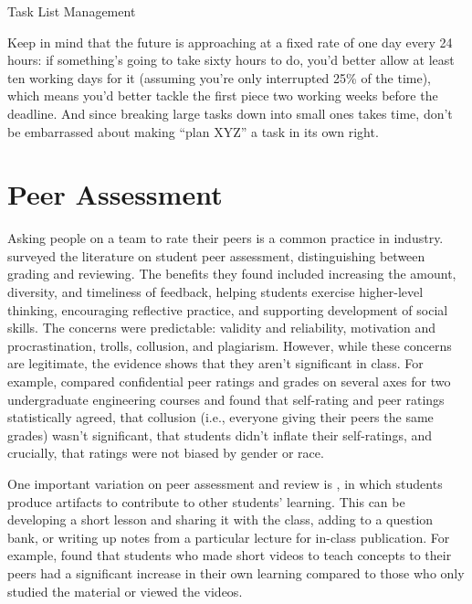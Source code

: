 \begin{callout}{Task List Management}

  Keep in mind that the future is approaching at a fixed rate of one
  day every 24 hours: if something's going to take sixty hours to do,
  you'd better allow at least ten working days for it (assuming you're
  only interrupted 25\% of the time), which means you'd better tackle
  the first piece two working weeks before the deadline.  And since
  breaking large tasks down into small ones takes time, don't be
  embarrassed about making ``plan XYZ'' a task in its own right.

\end{callout}

\section{Peer Assessment}\label{s:individual-peer}

Asking people on a team to rate their peers is a common practice in
industry.  \cite{Sond2012} surveyed the literature on student peer
assessment, distinguishing between grading and reviewing.  The
benefits they found included increasing the amount, diversity, and
timeliness of feedback, helping students exercise higher-level
thinking, encouraging reflective practice, and supporting development
of social skills.  The concerns were predictable: validity and
reliability, motivation and procrastination, trolls, collusion, and
plagiarism.  However, while these concerns are legitimate, the
evidence shows that they aren't significant in class.  For example,
\cite{Kauf2000} compared confidential peer ratings and grades on
several axes for two undergraduate engineering courses and found that
self-rating and peer ratings statistically agreed, that collusion
(i.e., everyone giving their peers the same grades) wasn't
significant, that students didn't inflate their self-ratings, and
crucially, that ratings were not biased by gender or race.

One important variation on peer assessment and review is
, in
which students produce artifacts to contribute to other students'
learning.  This can be developing a short lesson and sharing it with
the class, adding to a question bank, or writing up notes from a
particular lecture for in-class publication.  For example,
\cite{Fran2018} found that students who made short videos to teach
concepts to their peers had a significant increase in their own
learning compared to those who only studied the material or viewed the
videos.

